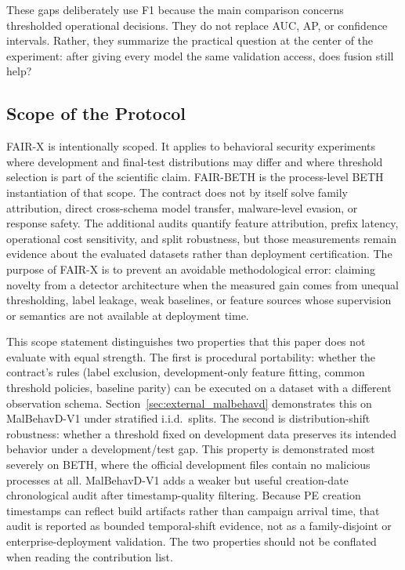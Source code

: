 \documentclass[10pt,journal,compsoc]{IEEEtran}
\begin{document}
These gaps deliberately use F1 because the main comparison concerns thresholded operational decisions. They do not replace AUC, AP, or confidence intervals. Rather, they summarize the practical question at the center of the experiment: after giving every model the same validation access, does fusion still help?

\subsection{Scope of the Protocol}

FAIR-X is intentionally scoped. It applies to behavioral security experiments where development and final-test distributions may differ and where threshold selection is part of the scientific claim. FAIR-BETH is the process-level BETH instantiation of that scope. The contract does not by itself solve family attribution, direct cross-schema model transfer, malware-level evasion, or response safety. The additional audits quantify feature attribution, prefix latency, operational cost sensitivity, and split robustness, but those measurements remain evidence about the evaluated datasets rather than deployment certification. The purpose of FAIR-X is to prevent an avoidable methodological error: claiming novelty from a detector architecture when the measured gain comes from unequal thresholding, label leakage, weak baselines, or feature sources whose supervision or semantics are not available at deployment time.

This scope statement distinguishes two properties that this paper does not evaluate with equal strength. The first is procedural portability: whether the contract's rules (label exclusion, development-only feature fitting, common threshold policies, baseline parity) can be executed on a dataset with a different observation schema. Section~\ref{sec:external_malbehavd} demonstrates this on MalBehavD-V1 under stratified i.i.d.\ splits. The second is distribution-shift robustness: whether a threshold fixed on development data preserves its intended behavior under a development/test gap. This property is demonstrated most severely on BETH, where the official development files contain no malicious processes at all. MalBehavD-V1 adds a weaker but useful creation-date chronological audit after timestamp-quality filtering. Because PE creation timestamps can reflect build artifacts rather than campaign arrival time, that audit is reported as bounded temporal-shift evidence, not as a family-disjoint or enterprise-deployment validation. The two properties should not be conflated when reading the contribution list.
\end{document}
